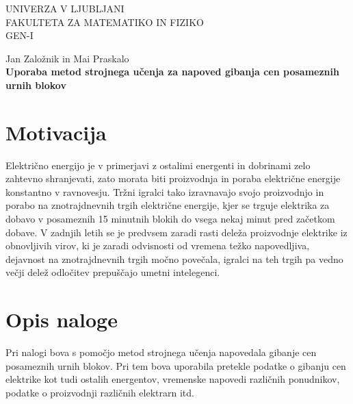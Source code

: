 \documentclass[12pt,a4paper]{amsart}
\theoremstyle{definition} %
\theoremstyle{plain} %
\newcommand{\program}{Matematika z računalnikom} %
\newcommand{\imeavtorja}{Jan Založnik in Mai Praskalo} %
\newcommand{\imementorja}{} %
\newcommand{\naslovdela}{}
\newcommand{\letnica}{2022} %
\begin{document}
\thispagestyle{empty}
\noindent\large
UNIVERZA V LJUBLJANI\\[3mm]
FAKULTETA ZA MATEMATIKO IN FIZIKO\\[2mm]
GEN-I\\[5mm]
\vfill

\begin{center}{\large
\imeavtorja\\[2mm]
{\bf Uporaba metod strojnega učenja za napoved gibanja cen posameznih urnih blokov}\\[1cm]
}
\end{center}
\vfill

\noindent{\large
Ljubljana, \letnica}

\pagebreak
\tableofcontents
\listoffigures
\pagebreak

\section{Motivacija}

Električno energijo je v primerjavi z ostalimi energenti in dobrinami zelo zahtevno shranjevati, 
zato morata biti proizvodnja in poraba električne energije konstantno v ravnovesju.
Tržni igralci tako izravnavajo svojo proizvodnjo in porabo na znotrajdnevnih trgih električne energije,
kjer se trguje elektrika za dobavo v posameznih 15 minutnih blokih do vsega nekaj minut pred začetkom 
dobave. V zadnjih letih se je predvsem zaradi rasti deleža proizvodnje elektrike iz obnovljivih virov, 
ki je zaradi odvisnosti od vremena težko napovedljiva, dejavnost na znotrajdnevnih trgih močno povečala, 
igralci na teh trgih pa vedno večji delež odločitev prepuščajo umetni intelegenci.



\section{Opis naloge}

Pri nalogi bova s pomočjo metod strojnega učenja napovedala gibanje cen posameznih urnih
 blokov. Pri tem bova uporabila pretekle podatke o gibanju cen elektrike kot tudi ostalih energentov, 
 vremenske napovedi različnih ponudnikov, podatke o proizvodnji različnih elektrarn itd. 
\end{document}
